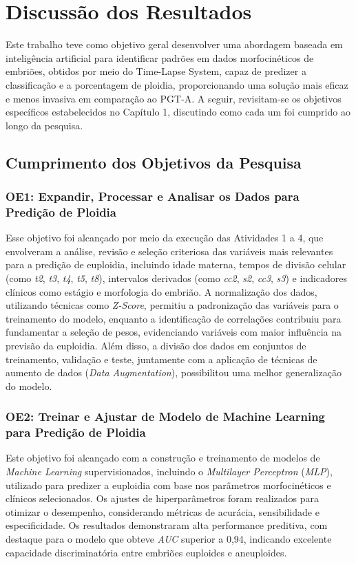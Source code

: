 \chapter[ Discussão dos Resultados]{ Discussão dos Resultados}

Este trabalho teve como objetivo geral desenvolver uma abordagem baseada em inteligência artificial para identificar padrões em dados morfocinéticos de embriões, obtidos por meio do Time-Lapse System, capaz de predizer a classificação e a porcentagem de ploidia, proporcionando uma solução mais eficaz e menos invasiva em comparação ao PGT-A. A seguir, revisitam-se os objetivos específicos estabelecidos no Capítulo 1, discutindo como cada um foi cumprido ao longo da pesquisa.

\section{Cumprimento dos Objetivos da Pesquisa}
\subsection{OE1: Expandir, Processar e Analisar os Dados para Predição de Ploidia}
Esse objetivo foi alcançado por meio da execução das Atividades 1 a 4, que envolveram a análise, revisão e seleção criteriosa das variáveis mais relevantes para a predição de euploidia, incluindo idade materna, tempos de divisão celular (como \textit{t2}, \textit{t3}, \textit{t4}, \textit{t5}, \textit{t8}), intervalos derivados (como \textit{cc2}, \textit{s2}, \textit{cc3}, \textit{s3}) e indicadores clínicos como estágio e morfologia do embrião. A normalização dos dados, utilizando técnicas como \textit{Z-Score}, permitiu a padronização das variáveis para o treinamento do modelo, enquanto a identificação de correlações contribuiu para fundamentar a seleção de pesos, evidenciando variáveis com maior influência na previsão da euploidia. Além disso, a divisão dos dados em conjuntos de treinamento, validação e teste, juntamente com a aplicação de técnicas de aumento de dados (\textit{Data Augmentation}), possibilitou uma melhor generalização do modelo.

\subsection{OE2: Treinar e Ajustar de Modelo de Machine Learning para Predição de Ploidia}
Este objetivo foi alcançado com a construção e treinamento de modelos de \textit{Machine Learning} supervisionados, incluindo o \textit{Multilayer Perceptron} (\textit{MLP}), utilizado para predizer a euploidia com base nos parâmetros morfocinéticos e clínicos selecionados. Os ajustes de hiperparâmetros foram realizados para otimizar o desempenho, considerando métricas de acurácia, sensibilidade e especificidade. Os resultados demonstraram alta performance preditiva, com destaque para o modelo que obteve \textit{AUC} superior a 0{,}94, indicando excelente capacidade discriminatória entre embriões euploides e aneuploides.

